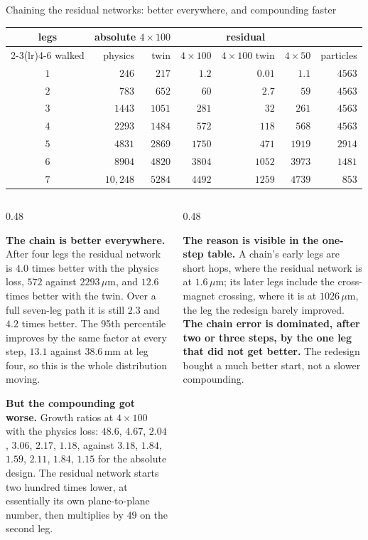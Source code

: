 \documentclass[aspectratio=169,10pt]{beamer}
\newcommand{\um}{\ensuremath{\,\mu\mathrm{m}}}
\newcommand{\mm}{\ensuremath{\,\mathrm{mm}}}
\newcommand{\hl}[1]{{\color{accent}\textbf{#1}}}
\newcommand{\bad}[1]{{\color{warm}\textbf{#1}}}
\begin{document}
\begin{frame}[shrink=25]{Chaining the residual networks: better everywhere, and compounding faster}
  \vspace{2mm}
  \centering\small
  \begin{tabular}{@{}crrrrrr@{}}
    \toprule
    legs & \multicolumn{2}{c}{absolute $4{\times}100$} & \multicolumn{3}{c}{residual} & \\
    \cmidrule(lr){2-3}\cmidrule(lr){4-6}
    walked & physics & twin & $4{\times}100$ & $4{\times}100$ twin & $4{\times}50$ & particles \\
    \midrule
    $1$ & $246$      & $217$  & \hl{$1.2$}  & $0.01$ & $1.1$  & $4563$ \\
    $2$ & $783$      & $652$  & \hl{$60$}   & $2.7$  & $59$   & $4563$ \\
    $3$ & $1443$     & $1051$ & \hl{$281$}  & $32$   & $261$  & $4563$ \\
    $4$ & $2293$     & $1484$ & \hl{$572$}  & $118$  & $568$  & $4563$ \\
    $5$ & $4831$     & $2869$ & $1750$      & $471$  & $1919$ & $2914$ \\
    $6$ & $8904$     & $4820$ & $3804$      & $1052$ & $3973$ & $1481$ \\
    $7$ & $10{,}248$ & $5284$ & $4492$      & $1259$ & $4739$ & $853$ \\
    \bottomrule
  \end{tabular}
  \vspace{2mm}

  \begin{columns}[T]
    \begin{column}{0.48\textwidth}
      {\small \hl{The chain is better everywhere.} After four legs the residual
       network is $4.0$ times better with the physics loss, $572$ against
       $2293\um$, and $12.6$ times better with the twin. Over a full seven-leg
       path it is still $2.3$ and $4.2$ times better. The 95th percentile
       improves by the same factor at every step, $13.1$ against $38.6\mm$ at
       leg four, so this is the whole distribution moving.
       \smallskip

       \bad{But the compounding got worse.} Growth ratios at $4\times100$ with
       the physics loss: $48.6$, $4.67$, $2.04$, $3.06$, $2.17$, $1.18$, against
       $3.18$, $1.84$, $1.59$, $2.11$, $1.84$, $1.15$ for the absolute design.
       The residual network starts two hundred times lower, at essentially its
       own plane-to-plane number, then multiplies by $49$ on the second leg.}
    \end{column}
    \begin{column}{0.48\textwidth}
      {\small \hl{The reason is visible in the one-step table.} A chain's early
       legs are short hops, where the residual network is at $1.6\um$; its later
       legs include the cross-magnet crossing, where it is at $1026\um$, the leg
       the redesign barely improved. \bad{The chain error is dominated, after
       two or three steps, by the one leg that did not get better.} The redesign
       bought a much better start, not a slower compounding.
       \smallskip

}
\end{column}
\end{columns}
\end{frame}
\end{document}
